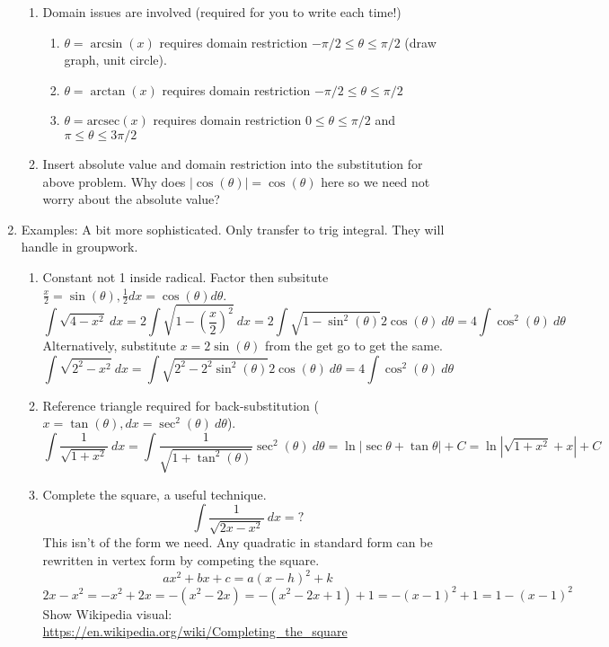 \documentclass{article}
\begin{document}
\begin{enumerate}
\begin{enumerate}
\item Domain issues are involved (required for you to write each time!)
\begin{enumerate}
\item $\theta = \arcsin(x)$ requires domain restriction $-\pi/2\leq \theta\leq \pi/2$ (draw graph, unit circle).
\item $\theta = \arctan(x)$ requires domain restriction $-\pi/2\leq \theta\leq \pi/2$ 
\item $\theta = \text{arcsec}(x)$ requires domain restriction $0\leq \theta\leq \pi/2$ and $\pi\leq\theta\leq 3\pi/2$ 
\end{enumerate}

\item Insert absolute value and domain restriction into the substitution for above problem. 
Why does $|\cos(\theta)|=\cos(\theta)$ here so we need not worry about the absolute value?
\end{enumerate}


\item Examples: A bit more sophisticated. Only transfer to trig integral. They will handle in groupwork.
\begin{enumerate}
\item Constant not 1 inside radical. Factor then subsitute $\frac{x}{2} = \sin(\theta), \frac{1}{2}dx = \cos(\theta) d\theta$.
\[
\int \sqrt{4-x^2}~dx = 2 \int \sqrt{1-\left(\frac{x}{2}\right)^2} ~dx
= 2 \int \sqrt{1-\sin^2(\theta)} 2\cos(\theta)~d\theta
= 4 \int \cos^2(\theta)~d\theta
\]
Alternatively, substitute $x=2\sin(\theta)$ from the get go to get the same.
\[
\int \sqrt{2^2-x^2}~dx = \int \sqrt{2^2-2^2\sin^2(\theta)} 2\cos(\theta)~d\theta
= 4 \int \cos^2(\theta)~d\theta
\]
\item Reference triangle required for back-substitution ($x=\tan(\theta), dx=\sec^2(\theta)~d\theta$).
\[
\int \frac{1}{\sqrt{1+x^2}}~dx = \int \frac{1}{\sqrt{1+\tan^2(\theta)}}\sec^2(\theta)~d\theta = 
\ln |\sec\theta+\tan\theta|+C = \ln|\sqrt{1+x^2}+x|+C
\]

\item Complete the square, a useful technique.
\[
\int \frac{1}{\sqrt{2x-x^2}}~dx = ?
\]
This isn't of the form we need.
Any quadratic in standard form can be rewritten in vertex form by competing the square.
\[
ax^2+bx+c = a(x-h)^2+k
\]
\[
2x-x^2 = -x^2 + 2x = -(x^2-2x) = -(x^2-2x+1)+1 = -(x-1)^2+1 = 1-(x-1)^2
\]
Show Wikipedia visual: \url{https://en.wikipedia.org/wiki/Completing_the_square}


\end{enumerate}
\end{enumerate}
\end{document}
